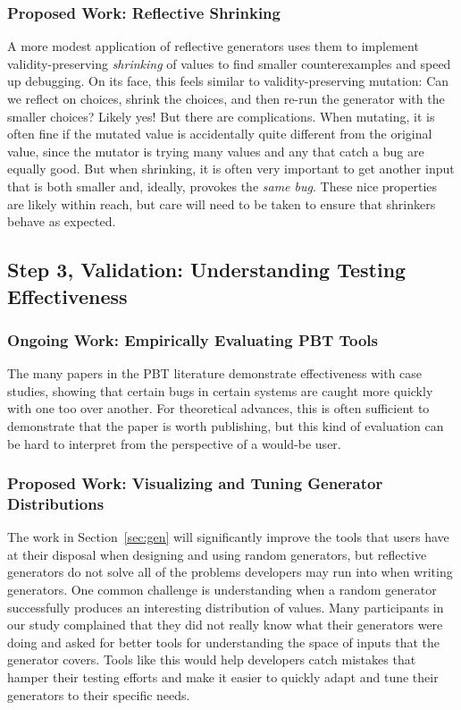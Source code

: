 \subsubsection{Proposed Work: Reflective Shrinking}
A more modest application of reflective generators uses them to implement
validity-preserving {\em shrinking} of values to find smaller counterexamples
and speed up debugging. On its face, this feels similar to validity-preserving
mutation: Can we reflect on choices, shrink the choices, and then re-run the
generator with the smaller choices? Likely yes! But there are complications.
When mutating, it is often fine if the mutated value is accidentally quite
different from the original value, since the mutator is trying many values and
any that catch a bug are equally good. But when shrinking, it is often very
important to get another input that is both smaller and, ideally, provokes the
{\em same bug}. These nice properties are likely within reach, but care will
need to be taken to ensure that shrinkers behave as expected.

\subsection{Step 3, Validation: Understanding Testing Effectiveness }\label{sec:val}
\subsubsection{Ongoing Work: Empirically Evaluating PBT Tools}
The many papers in the PBT literature demonstrate effectiveness with case
studies, showing that certain bugs in certain systems are caught more quickly
with one too over another. For theoretical advances, this is often sufficient
to demonstrate that the paper is worth publishing, but this kind of evaluation
can be hard to interpret from the perspective of a would-be user. 


\subsubsection{Proposed Work: Visualizing and Tuning Generator Distributions}
\newcommand{\genvis}{GenVis}
The work in Section~\ref{sec:gen} will significantly improve the tools that
users have at their disposal when designing and using random generators, but
reflective generators do not solve all of the problems developers may run into
when writing generators. One common challenge is understanding when a random
generator successfully produces an interesting distribution of values. Many
participants in our study complained that they did not really know what their
generators were doing and asked for better tools for understanding the space of
inputs that the generator covers. Tools like this would help developers catch
mistakes that hamper their testing efforts and make it easier to quickly adapt
and tune their generators to their specific needs.


